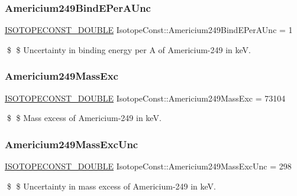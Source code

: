\subsubsection{\texorpdfstring{Americium249\+Bind\+E\+Per\+A\+Unc}{Americium249BindEPerAUnc}}
{\footnotesize\ttfamily \mbox{\hyperlink{group___isotope_const-_macros_ga8f45a7272ce02c0b4c65c44636ed719a}{I\+S\+O\+T\+O\+P\+E\+C\+O\+N\+S\+T\+\_\+\+D\+O\+U\+B\+LE}} Isotope\+Const\+::\+Americium249\+Bind\+E\+Per\+A\+Unc = 1}

\$ \$ Uncertainty in binding energy per A of Americium-\/249 in keV. \mbox{\label{group___isotope_const-_americium-_am249_gaf752a3eca9074bf1b992f0ebeb33f4ce}} 
\subsubsection{\texorpdfstring{Americium249\+Mass\+Exc}{Americium249MassExc}}
{\footnotesize\ttfamily \mbox{\hyperlink{group___isotope_const-_macros_ga8f45a7272ce02c0b4c65c44636ed719a}{I\+S\+O\+T\+O\+P\+E\+C\+O\+N\+S\+T\+\_\+\+D\+O\+U\+B\+LE}} Isotope\+Const\+::\+Americium249\+Mass\+Exc = 73104}

\$ \$ Mass excess of Americium-\/249 in keV. \mbox{\label{group___isotope_const-_americium-_am249_ga02592386f27f06aef273f4f668b6b7e6}} 
\subsubsection{\texorpdfstring{Americium249\+Mass\+Exc\+Unc}{Americium249MassExcUnc}}
{\footnotesize\ttfamily \mbox{\hyperlink{group___isotope_const-_macros_ga8f45a7272ce02c0b4c65c44636ed719a}{I\+S\+O\+T\+O\+P\+E\+C\+O\+N\+S\+T\+\_\+\+D\+O\+U\+B\+LE}} Isotope\+Const\+::\+Americium249\+Mass\+Exc\+Unc = 298}

\$ \$ Uncertainty in mass excess of Americium-\/249 in keV. \mbox{\label{group___isotope_const-_americium-_am249_ga68ec736a7a0d524a2e426b0d6ae23915}} 
